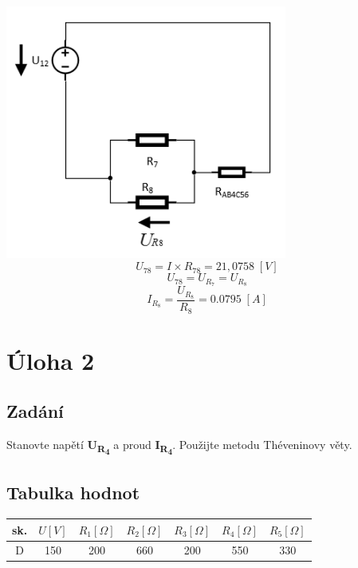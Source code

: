 \documentclass[a4paper,12pt]{article}
\begin{document}
		\subsubsection{} %
			\includegraphics[width=350px]{1_5.png}
			\begin{equation}
				U_{78} = I \times R_{78} = 21,0758 \;[V] \nonumber
			\end{equation}
			\begin{equation}
				U_{78} = U_{R_7} = U_{R_8}\nonumber
			\end{equation}
			\begin{equation}
				I_{R_{8}} = \frac{U_{R_{8}}}{R_8} = 0.0795 \;[A] \nonumber
			\end{equation}
			\pagebreak
\section{Úloha 2} %
	\subsection{Zadání}
		Stanovte napětí \textbf{U\textsubscript{R\textsubscript{4}}} a proud \textbf{I\textsubscript{R\textsubscript{4}}}. Použijte metodu Théveninovy věty.
	\subsection{Tabulka hodnot}
		\begin{table}[htbp]
			\centering
			\begin{tabular}{*{7}{c}}
				\toprule
				sk. & \(U [V]\) & \(R_1 [\Omega]\) & \(R_2 [\Omega]\) & \(R_3 [\Omega]\) & \(R_4 [\Omega]\) & \(R_5 [\Omega]\) \\
				\midrule
				D & 150 & 200 & 660 & 200 & 550 & 330 \\
				\bottomrule
			\end{tabular}
		\end{table}
\end{document}
